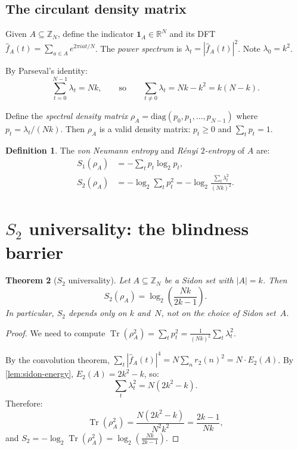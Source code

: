 \documentclass[11pt]{article}
\newtheorem{theorem}{Theorem}[section]
\theoremstyle{definition}
\newtheorem{definition}[theorem]{Definition}
\theoremstyle{remark}
\newcommand{\Z}{\mathbb{Z}}
\newcommand{\R}{\mathbb{R}}
\newcommand{\fhat}{\widehat{f}}
\newcommand{\Tr}{\operatorname{Tr}}
\begin{document}
\subsection{The circulant density matrix}

Given $A \subseteq \Z_N$, define the indicator
$\mathbf{1}_A \in \R^N$ and its DFT
$\fhat_A(t) = \sum_{a \in A} e^{2\pi i a t / N}$.
The \emph{power spectrum} is $\lambda_t = |\fhat_A(t)|^2$.
Note $\lambda_0 = k^2$.

By Parseval's identity:
\begin{equation}\label{eq:parseval}
  \sum_{t=0}^{N-1} \lambda_t = Nk,
  \qquad\text{so}\qquad
  \sum_{t \ne 0} \lambda_t = Nk - k^2 = k(N - k).
\end{equation}

Define the \emph{spectral density matrix}
$\rho_A = \text{diag}(p_0, p_1, \ldots, p_{N-1})$ where
$p_t = \lambda_t / (Nk)$.  Then $\rho_A$ is a valid density matrix:
$p_t \ge 0$ and $\sum_t p_t = 1$.

\begin{definition}\label{def:entropies}
The \emph{von Neumann entropy} and \emph{R\'enyi $2$-entropy} of $A$
are:
\begin{align*}
  S_1(\rho_A) &= -\sum_{t} p_t \log_2 p_t, \\
  S_2(\rho_A) &= -\log_2 \sum_{t} p_t^2
  = -\log_2 \frac{\sum_t \lambda_t^2}{(Nk)^2}.
\end{align*}
\end{definition}

\section{$S_2$ universality: the blindness barrier}\label{sec:S2}

\begin{theorem}[$S_2$ universality]\label{thm:S2-universal}
Let $A \subseteq \Z_N$ be a Sidon set with $|A| = k$.  Then
\[
  S_2(\rho_A) = \log_2\!\left(\frac{Nk}{2k - 1}\right).
\]
In particular, $S_2$ depends only on $k$ and~$N$, not on the choice
of Sidon set~$A$.
\end{theorem}

\begin{proof}
We need to compute $\Tr(\rho_A^2) = \sum_t p_t^2 =
\frac{1}{(Nk)^2} \sum_t \lambda_t^2$.

By the convolution theorem,
$\sum_t |\fhat_A(t)|^4 = N \sum_n r_2(n)^2 = N \cdot E_2(A)$.
By \cref{lem:sidon-energy}, $E_2(A) = 2k^2 - k$, so:
\[
  \sum_t \lambda_t^2 = N(2k^2 - k).
\]
Therefore:
\[
  \Tr(\rho_A^2) = \frac{N(2k^2 - k)}{N^2 k^2}
  = \frac{2k - 1}{Nk},
\]
and $S_2 = -\log_2 \Tr(\rho_A^2) = \log_2\!\left(\frac{Nk}{2k-1}\right)$.
\end{proof}
\end{document}
